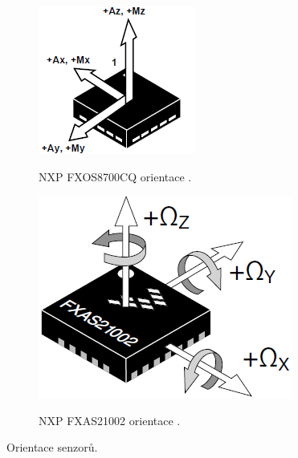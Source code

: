 \begin{figure}[ht]
    \centering
	\begin{subfigure}{0.35\textwidth}
	    \includegraphics[width = \textwidth]{Figures/FXOS_Orientation.png}
        \label{fig:FXOS_Orientation}
        \caption{NXP FXOS8700CQ orientace \cite{FXOS8700CQ}.}
        \label{fig:FXOS_Orientation}
	\end{subfigure}
    \begin{subfigure}{0.35\textwidth}
        \includegraphics[width = \textwidth]{Figures/FXAS_Orientation.png}
        \label{fig:FXAS_Orientation}
         \caption{NXP FXAS21002 orientace \cite{FXAS21002}.}
         \label{fig:FXAS_Orientation}
    \end{subfigure}
	\caption{Orientace senzorů.}
\end{figure}

